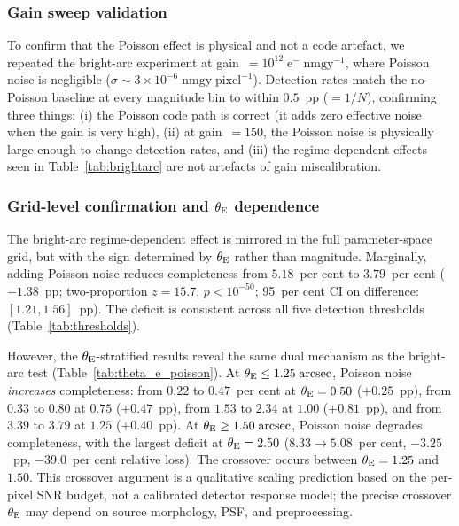 \documentclass[fleqn,usenatbib]{rasti}
\begin{document}
\subsubsection{Gain sweep validation}
\label{sec:gainsweep}

To confirm that the Poisson effect is physical and not a code artefact, we repeated the bright-arc experiment at gain~$= 10^{12}\;\mathrm{e^{-}\;nmgy^{-1}}$, where Poisson noise is negligible ($\sigma \sim 3 \times 10^{-6}\;\mathrm{nmgy\;pixel^{-1}}$).  Detection rates match the no-Poisson baseline at every magnitude bin to within $0.5$~pp ($= 1/N$), confirming three things: (i) the Poisson code path is correct (it adds zero effective noise when the gain is very high), (ii) at gain~$= 150$, the Poisson noise is physically large enough to change detection rates, and (iii) the regime-dependent effects seen in Table~\ref{tab:brightarc} are not artefacts of gain miscalibration.


\subsubsection{Grid-level confirmation and $\theta_{\rm E}$ dependence}

The bright-arc regime-dependent effect is mirrored in the full parameter-space grid, but with the sign determined by $\theta_{\rm E}$ rather than magnitude.  Marginally, adding Poisson noise reduces completeness from $5.18$~per cent to $3.79$~per cent ($-1.38$~pp; two-proportion $z = 15.7$, $p < 10^{-50}$; 95~per cent CI on difference: $[1.21, 1.56]$~pp).  The deficit is consistent across all five detection thresholds (Table~\ref{tab:thresholds}).

However, the $\theta_{\rm E}$-stratified results reveal the same dual mechanism as the bright-arc test (Table~\ref{tab:theta_e_poisson}).  At $\theta_{\rm E} \leq 1.25\;\mathrm{arcsec}$, Poisson noise \emph{increases} completeness: from $0.22$ to $0.47$~per cent at $\theta_{\rm E} = 0.50$ ($+0.25$~pp), from $0.33$ to $0.80$ at $0.75$ ($+0.47$~pp), from $1.53$ to $2.34$ at $1.00$ ($+0.81$~pp), and from $3.39$ to $3.79$ at $1.25$ ($+0.40$~pp).  At $\theta_{\rm E} \geq 1.50\;\mathrm{arcsec}$, Poisson noise degrades completeness, with the largest deficit at $\theta_{\rm E} = 2.50$ ($8.33 \to 5.08$~per cent, $-3.25$~pp, $-39.0$~per cent relative loss).  The crossover occurs between $\theta_{\rm E} = 1.25$ and $1.50$.  This crossover argument is a qualitative scaling prediction based on the per-pixel SNR budget, not a calibrated detector response model; the precise crossover $\theta_{\rm E}$ may depend on source morphology, PSF, and preprocessing.
\end{document}
